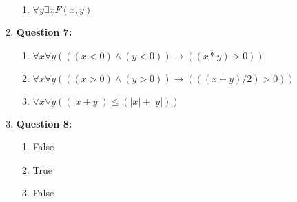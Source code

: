 \documentclass[11pt]{article}
\begin{document}
\begin{enumerate}
\begin{enumerate}[label=(\alph*)]
\item
$\forall y \exists x F(x,y)$

\end{enumerate}

\item
\textbf{Question 7:}

\begin{enumerate}[label=(\alph*)]
\item
$\forall x \forall y (((x<0)\land(y<0)) \rightarrow ((x*y)>0))$

\item
$\forall x \forall y (((x>0) \land (y>0)) \rightarrow (((x+y)/2)>0))$

\item
$\forall x \forall y ((\left| x+y \right|) \leq (\left| x \right|+\left| y \right|))$

\end{enumerate}

\item
\textbf{Question 8:}

\begin{enumerate}[label=(\alph*)]
\item
False

\item
True

\item
False

\end{enumerate}

\end{enumerate}
\end{document}

